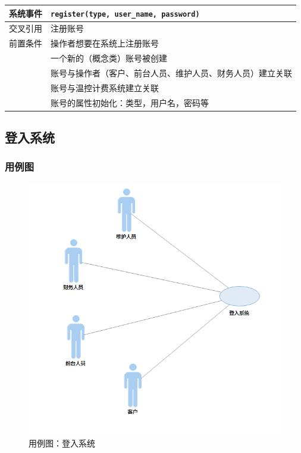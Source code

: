 \documentclass[black,normal,cn]{elegantnote}
\newcommand{\code}[1]{\colorbox{light-gray}{\texttt{#1}}}
\begin{document}
\begin{center}
    \begin{tabular}{|>{\centering}m{}|m{}|}
        \hline
        系统事件                  & \multicolumn{1}{l|}{\code{register(type, user\_name, password)}} \\
        \hline
        交叉引用                  & 注册账号                                                         \\
        \hline
        前置条件                  & 操作者想要在系统上注册账号                                       \\
        \hline
        \multirow{4}{*}{后置条件} & 一个新的（概念类）账号被创建                                     \\
        \cline{2-2}
                                  & 账号与操作者（客户、前台人员、维护人员、财务人员）建立关联       \\
        \cline{2-2}
                                  & 账号与温控计费系统建立关联                                       \\
        \cline{2-2}
                                  & 账号的属性初始化：类型，用户名，密码等                           \\
        \hline
    \end{tabular}
\end{center}

\subsection{登入系统}
\subsubsection{用例图}

\begin{figure}[H]
    \centering
    \includegraphics[width=.5\textwidth]{fig/276007.png}
    \caption{用例图：登入系统}
    \label{fig:276007}
\end{figure}
\end{document}
